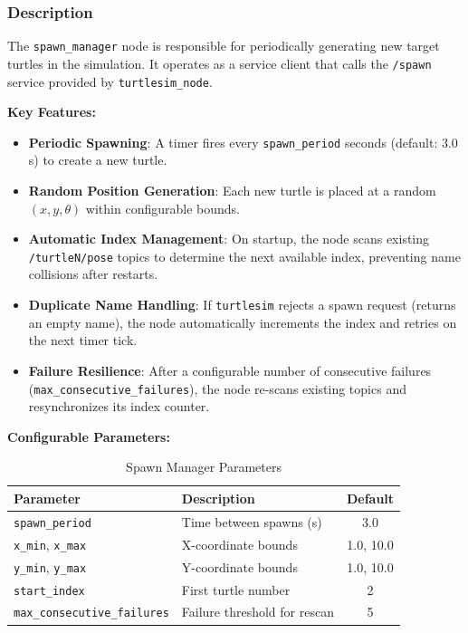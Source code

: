 \documentclass[12pt,a4paper]{article}
\begin{document}
\subsubsection{Description}

The \texttt{spawn\_manager} node is responsible for periodically generating new target turtles in the simulation. It operates as a service client that calls the \texttt{/spawn} service provided by \texttt{turtlesim\_node}.

\textbf{Key Features:}
\begin{itemize}
  \item \textbf{Periodic Spawning}: A timer fires every \texttt{spawn\_period} seconds (default: 3.0\,s) to create a new turtle.
  \item \textbf{Random Position Generation}: Each new turtle is placed at a random $(x, y, \theta)$ within configurable bounds.
  \item \textbf{Automatic Index Management}: On startup, the node scans existing \texttt{/turtleN/pose} topics to determine the next available index, preventing name collisions after restarts.
  \item \textbf{Duplicate Name Handling}: If \texttt{turtlesim} rejects a spawn request (returns an empty name), the node automatically increments the index and retries on the next timer tick.
  \item \textbf{Failure Resilience}: After a configurable number of consecutive failures (\texttt{max\_consecutive\_failures}), the node re-scans existing topics and resynchronizes its index counter.
\end{itemize}

\textbf{Configurable Parameters:}

\begin{table}[H]
\centering
\caption{Spawn Manager Parameters}
\begin{tabular}{llc}
\toprule
\textbf{Parameter} & \textbf{Description} & \textbf{Default} \\
\midrule
\texttt{spawn\_period} & Time between spawns (s) & 3.0 \\
\texttt{x\_min}, \texttt{x\_max} & X-coordinate bounds & 1.0, 10.0 \\
\texttt{y\_min}, \texttt{y\_max} & Y-coordinate bounds & 1.0, 10.0 \\
\texttt{start\_index} & First turtle number & 2 \\
\texttt{max\_consecutive\_failures} & Failure threshold for rescan & 5 \\
\bottomrule
\end{tabular}
\end{table}
\end{document}
